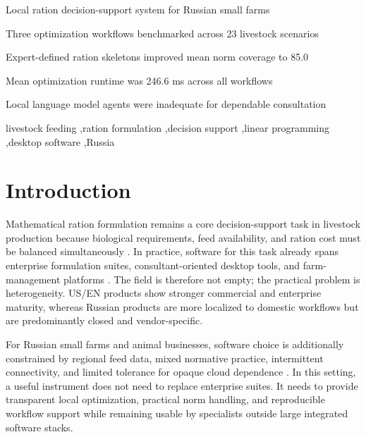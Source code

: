 \documentclass[a4paper,fleqn]{cas-sc}
\begin{document}
\begin{highlights}
\item Local ration decision-support system for Russian small farms
\item Three optimization workflows benchmarked across 23 livestock scenarios
\item Expert-defined ration skeletons improved mean norm coverage to 85.0
\item Mean optimization runtime was 246.6 ms across all workflows
\item Local language model agents were inadequate for dependable consultation
\end{highlights}

\begin{keywords}
livestock feeding \sep ration formulation \sep decision support \sep linear programming \sep desktop software \sep Russia
\end{keywords}

\maketitle

\section{Introduction}\label{sec:introduction}

Mathematical ration formulation remains a core decision-support task in livestock production because biological requirements, feed availability, and ration cost must be balanced simultaneously \citep{nASEM2021, dantzig1963, zhai2020, tedeschi2021smart}. In practice, software for this task already spans enterprise formulation suites, consultant-oriented desktop tools, and farm-management platforms \citep{datacor2026, mixit2026, winfeed2026, korall2026, deltakorm2026, onecow2026, winmix2026}. The field is therefore not empty; the practical problem is heterogeneity. US/EN products show stronger commercial and enterprise maturity, whereas Russian products are more localized to domestic workflows but are predominantly closed and vendor-specific.

For Russian small farms and animal businesses, software choice is additionally constrained by regional feed data, mixed normative practice, intermittent connectivity, and limited tolerance for opaque cloud dependence \citep{kalashnikov2003, vizh2020, aquilani2022, selvaggi2024}. In this setting, a useful instrument does not need to replace enterprise suites. It needs to provide transparent local optimization, practical norm handling, and reproducible workflow support while remaining usable by specialists outside large integrated software stacks.
\end{document}
